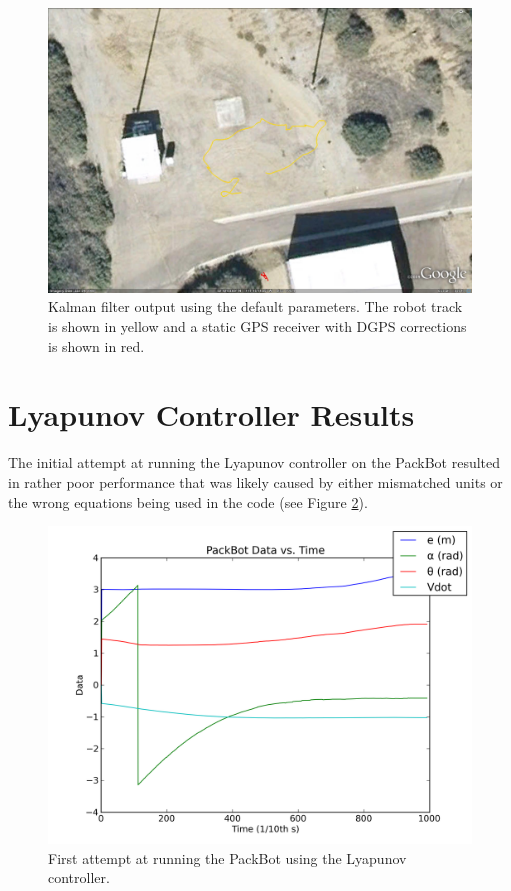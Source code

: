 \begin{figure}[ht!]
	\centering
	\includegraphics[width=.95\textwidth]{images/kfPlainDataFirstAttempt}
	\caption{Kalman filter output using the default parameters. The robot track is shown in yellow and a static GPS receiver with DGPS corrections is shown in red.}
	\label{fig:kfPlainDataFirstAttempt}
\end{figure}

\section{Lyapunov Controller Results}
\label{sec:lyapunovResults}
The initial attempt at running the Lyapunov controller on the PackBot resulted in rather poor performance that was likely caused by either mismatched units or the wrong equations being used in the code (see Figure \ref{fig:lyapunovDataFirstAttempt}).

\begin{figure}[ht!]
	\centering
	\includegraphics[width=.95\textwidth]{images/pbData}
	\caption{First attempt at running the PackBot using the Lyapunov controller.}
	\label{fig:lyapunovDataFirstAttempt}
\end{figure}